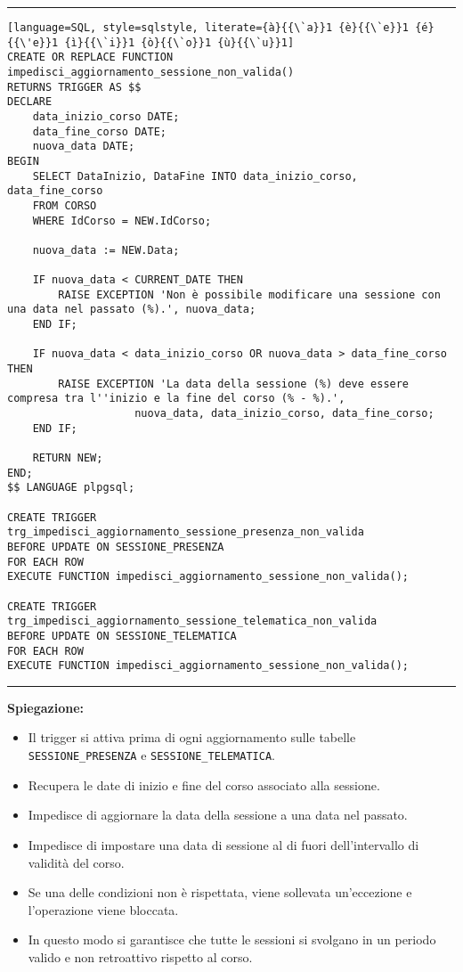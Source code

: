 \noindent\rule{\textwidth}{0.4pt}
\begin{lstlisting}[language=SQL, style=sqlstyle, literate={à}{{\`a}}1 {è}{{\`e}}1 {é}{{\'e}}1 {ì}{{\`i}}1 {ò}{{\`o}}1 {ù}{{\`u}}1]
CREATE OR REPLACE FUNCTION impedisci_aggiornamento_sessione_non_valida()
RETURNS TRIGGER AS $$
DECLARE
    data_inizio_corso DATE;
    data_fine_corso DATE;
    nuova_data DATE;
BEGIN
    SELECT DataInizio, DataFine INTO data_inizio_corso, data_fine_corso
    FROM CORSO
    WHERE IdCorso = NEW.IdCorso;

    nuova_data := NEW.Data;

    IF nuova_data < CURRENT_DATE THEN
        RAISE EXCEPTION 'Non è possibile modificare una sessione con una data nel passato (%).', nuova_data;
    END IF;

    IF nuova_data < data_inizio_corso OR nuova_data > data_fine_corso THEN
        RAISE EXCEPTION 'La data della sessione (%) deve essere compresa tra l''inizio e la fine del corso (% - %).',
                    nuova_data, data_inizio_corso, data_fine_corso;
    END IF;

    RETURN NEW;
END;
$$ LANGUAGE plpgsql;

CREATE TRIGGER trg_impedisci_aggiornamento_sessione_presenza_non_valida
BEFORE UPDATE ON SESSIONE_PRESENZA
FOR EACH ROW
EXECUTE FUNCTION impedisci_aggiornamento_sessione_non_valida();

CREATE TRIGGER trg_impedisci_aggiornamento_sessione_telematica_non_valida
BEFORE UPDATE ON SESSIONE_TELEMATICA
FOR EACH ROW
EXECUTE FUNCTION impedisci_aggiornamento_sessione_non_valida();
\end{lstlisting}
\noindent\rule{\textwidth}{0.4pt}

\textbf{Spiegazione:}
\begin{itemize}
    \item Il trigger si attiva prima di ogni aggiornamento sulle tabelle \texttt{SESSIONE\_PRESENZA} e \texttt{SESSIONE\_TELEMATICA}.
    \item Recupera le date di inizio e fine del corso associato alla sessione.
    \item Impedisce di aggiornare la data della sessione a una data nel passato.
    \item Impedisce di impostare una data di sessione al di fuori dell’intervallo di validità del corso.
    \item Se una delle condizioni non è rispettata, viene sollevata un’eccezione e l’operazione viene bloccata.
    \item In questo modo si garantisce che tutte le sessioni si svolgano in un periodo valido e non retroattivo rispetto al corso.
\end{itemize}

